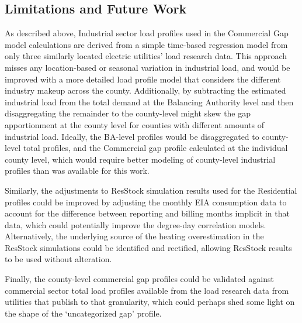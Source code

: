 \subsection{Limitations and Future Work}
As described above, Industrial sector load profiles used in the Commercial Gap model calculations are derived from a simple time-based regression model from only three similarly located electric utilities’ load research data. This approach misses any location-based or seasonal variation in industrial load, and would be improved with a more detailed load profile model that considers the different industry makeup across the county. Additionally, by subtracting the estimated industrial load from the total demand at the Balancing Authority level and then disaggregating the remainder to the county-level might skew the gap apportionment at the county level for counties with different amounts of industrial load. Ideally, the BA-level profiles would be disaggregated to county-level total profiles, and the Commercial gap profile calculated at the individual county level, which would require better modeling of county-level industrial profiles than was available for this work.

Similarly, the adjustments to ResStock simulation results used for the Residential profiles could be improved by adjusting the monthly EIA consumption data to account for the difference between reporting and billing months implicit in that data, which could potentially improve the degree-day correlation models. Alternatively, the underlying source of the heating overestimation in the ResStock simulations could be identified and rectified, allowing ResStock results to be used without alteration.

Finally, the county-level commercial gap profiles could be validated against commercial sector total load profiles available from the load research data from utilities that publish to that granularity, which could perhaps shed some light on the shape of the ‘uncategorized gap’ profile.
